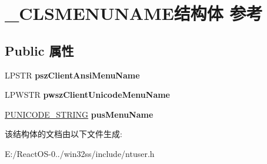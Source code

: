 \hypertarget{struct___c_l_s_m_e_n_u_n_a_m_e}{}\section{\+\_\+\+C\+L\+S\+M\+E\+N\+U\+N\+A\+M\+E结构体 参考}
\label{struct___c_l_s_m_e_n_u_n_a_m_e}
\subsection*{Public 属性}
\begin{DoxyCompactItemize}
\item 
\mbox{\label{struct___c_l_s_m_e_n_u_n_a_m_e_ade3809cf28820ae94b0771b0c287cc54}} 
L\+P\+S\+TR {\bfseries psz\+Client\+Ansi\+Menu\+Name}
\item 
\mbox{\label{struct___c_l_s_m_e_n_u_n_a_m_e_ae8a7d6cb1172068cc907e71055e42bb1}} 
L\+P\+W\+S\+TR {\bfseries pwsz\+Client\+Unicode\+Menu\+Name}
\item 
\mbox{\label{struct___c_l_s_m_e_n_u_n_a_m_e_a097e5aa9d270d58b01de4deef0990427}} 
\hyperlink{struct___u_n_i_c_o_d_e___s_t_r_i_n_g}{P\+U\+N\+I\+C\+O\+D\+E\+\_\+\+S\+T\+R\+I\+NG} {\bfseries pus\+Menu\+Name}
\end{DoxyCompactItemize}


该结构体的文档由以下文件生成\+:\begin{DoxyCompactItemize}
\item 
E\+:/\+React\+O\+S-\/0../win32ss/include/ntuser.\+h\end{DoxyCompactItemize}
